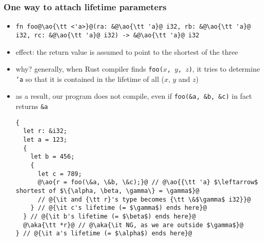 \documentclass[12pt,dvipdfmx]{beamer}
\newcommand{\ao}[1]{{\color{blue}#1}}
\newcommand{\aka}[1]{{\color{red}#1}}
\begin{document}
\begin{frame}[fragile]
  \frametitle{One way to attach lifetime parameters}
\begin{itemize}
\item
\begin{lstlisting}
fn foo@\ao{\tt <'a>}@(ra: &@\ao{\tt 'a}@ i32, rb: &@\ao{\tt 'a}@ i32, rc: &@\ao{\tt 'a}@ i32) -> &@\ao{\tt 'a}@ i32
\end{lstlisting}
\item effect: the return value is assumed to point to the shortest
  of the three
\item why? generally, when Rust compiler finds {\tt foo($x$, $y$, $z$)},
  it tries to determine {\tt 'a} so that it is contained
  in the lifetime of all ($x$, $y$ and $z$)
\item as a result, our program does not compile,
  even if {\tt foo(\&a, \&b, \&c)} in fact returns {\tt \&a}
\begin{lstlisting}[basicstyle=\ttfamily\tiny]
{    
  let r: &i32;
  let a = 123;
  {
    let b = 456;
    {
      let c = 789;
      @\ao{r = foo(\&a, \&b, \&c);}@ // @\ao{{\tt 'a} $\leftarrow$ shortest of $\{\alpha, \beta, \gamma\} = \gamma$}@
      // @{\it and {\tt r}'s type becomes {\tt \&$\gamma$ i32}}@
    } // @{\it c's lifetime (= $\gamma$) ends here}@
  } // @{\it b's lifetime (= $\beta$) ends here}@
  @\aka{\tt *r}@ // @\aka{\it NG, as we are outside $\gamma$}@
} // @{\it a's lifetime (= $\alpha$) ends here}@
\end{lstlisting}
\end{itemize}
\end{frame}
\end{document}
